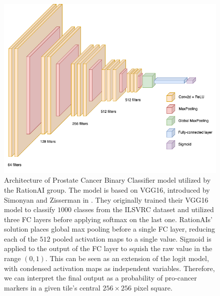 \begin{figure}
    \begin{center}
    \begin{minipage}{0.75\textwidth}
      \includegraphics[width=\textwidth]{img/nn-arch.png}
    \end{minipage}
    \caption{Architecture of Prostate Cancer Binary Classifier model utilized by the RationAI group. The model is based on VGG16, introduced by Simonyan and Zisserman in \cite{vgg16}. They originally trained their VGG16 model to classify $1000$ classes from the ILSVRC dataset \cite{ilsvrc} and utilized three FC layers before applying softmax on the last one. RationAIs' solution places global max pooling before a single FC layer, reducing each of the $512$ pooled activation maps to a single value. Sigmoid is applied to the output of the FC layer to squish the raw value in the range $(0, 1)$. This can be seen as an extension of the logit model, with condensed activation maps as independent variables. Therefore, we can interpret the final output as a probability of pro-cancer markers in a given tile's central $256 \times 256$ pixel square.}
    \label{fig:rationai-vgg16}
    \end{center}
\end{figure}

